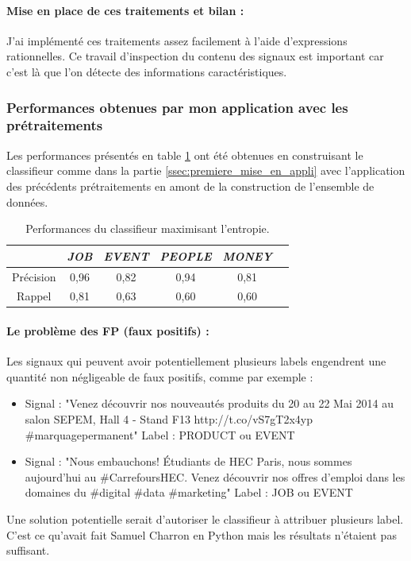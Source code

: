                 \paragraph{Mise en place de ces traitements et bilan :}
                    J'ai implémenté ces traitements assez facilement à l'aide d'expressions rationnelles. Ce travail d'inspection du contenu des signaux est important car c'est là que l'on détecte des informations caractéristiques.

            \subsubsection{Performances obtenues par mon application avec les prétraitements}
                Les performances présentés en table \ref{tab:classif_perf4} ont été obtenues en construisant le classifieur comme dans la partie \ref{ssec:premiere_mise_en_appli} avec l'application des précédents prétraitements en amont de la construction de l'ensemble de données.
                \begin{table}[t]
                    \centering
                    \begin{tabular}{| c | c | c | c | c | c |}
                        \hline
                         & \textit{JOB} & \textit{EVENT} & \textit{PEOPLE} & \textit{MONEY} \\
                        \hline
                        Précision & 0,96 & 0,82 & 0,94 & 0,81 \\
                        Rappel & 0,81 & 0,63 & 0,60 & 0,60 \\
                        \hline
                    \end{tabular}
                    \caption{Performances du classifieur maximisant l'entropie.}
                    \label{tab:classif_perf4}
                \end{table}


                \paragraph{Le problème des FP (faux positifs) :}
                    Les signaux qui peuvent avoir potentiellement plusieurs labels engendrent une quantité non négligeable de faux positifs, comme par exemple :
                    \begin{itemize}
                        \item Signal : "Venez découvrir nos nouveautés produits du 20 au 22 Mai 2014 au salon SEPEM, Hall 4 - Stand F13 http://t.co/vS7gT2x4yp \#marquagepermanent" Label : PRODUCT ou EVENT
                        \item Signal : "Nous embauchons! Étudiants de HEC Paris, nous sommes aujourd'hui au \#CarrefoursHEC. Venez découvrir nos offres d'emploi dans les domaines du \#digital \#data \#marketing" Label : JOB ou EVENT
                    \end{itemize}
                    Une solution potentielle serait d'autoriser le classifieur à attribuer plusieurs label. C'est ce qu'avait fait Samuel Charron en Python mais les résultats n'étaient pas suffisant.

